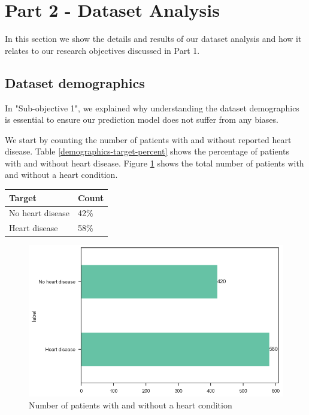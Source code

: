 \section{Part 2 - Dataset Analysis}

In this section we show the details and results of our dataset analysis and how it relates
to our research objectives discussed in Part 1.

\subsection{Dataset demographics}

In "Sub-objective 1", we explained why understanding the dataset demographics is essential to ensure
our prediction model does not suffer from any biases.

We start by counting the number of patients with and without reported heart disease. Table \ref{demographics-target-percent}
shows the percentage of patients with and without heart disease. Figure \ref{demographics-target-count} shows
the total number of patients with and without a heart condition.

\small
\begin{tabularx}{\linewidth}{ | X | X |}
    \caption{Distribution of patients with and without a heart condition}\label{demographics-target-percent} \\
    \hline
    \textbf{Target} & \textbf{Count}\\
    \hline
    No heart disease & 42\% \\
    \hline
    Heart disease & 58\% \\
    \hline
\end{tabularx}
\normalsize

\begin{figure}[H]
    \caption{Number of patients with and without a heart condition}\label{demographics-target-count}
    \centering
    \includegraphics[width=\linewidth]{media/demographics-01-target.png}
\end{figure}

